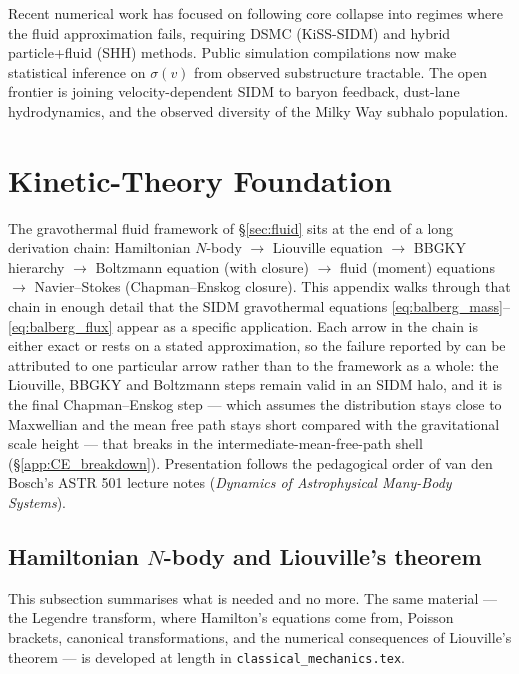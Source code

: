 \documentclass[12pt]{article}
\begin{document}
Recent numerical work \citep{Gurian2025Core,Schon2025} has focused on
following core collapse into regimes where the fluid approximation
fails, requiring DSMC (KiSS-SIDM) and hybrid particle+fluid (SHH)
methods.  Public simulation compilations \citep{Palubski2025} now
make statistical inference on $\sigma(v)$ from observed substructure
tractable.  The open frontier is joining velocity-dependent SIDM to
baryon feedback, dust-lane hydrodynamics, and the observed
diversity of the Milky Way subhalo population.

\appendix

\section{Kinetic-Theory Foundation}
\label{app:kinetic}

The gravothermal fluid framework of \S\ref{sec:fluid} sits at the end
of a long derivation chain: Hamiltonian $N$-body $\to$ Liouville
equation $\to$ BBGKY hierarchy $\to$ Boltzmann equation (with closure)
$\to$ fluid (moment) equations $\to$ Navier--Stokes (Chapman--Enskog
closure).  This appendix walks through that chain in enough detail
that the SIDM gravothermal equations
\eqref{eq:balberg_mass}--\eqref{eq:balberg_flux} appear as a specific
application.  Each arrow in the chain is either exact or rests on a
stated approximation, so the failure reported by
\citet{Gurian2025Core} can be attributed to one particular arrow rather
than to the framework as a whole: the Liouville, BBGKY and Boltzmann
steps remain valid in an SIDM halo, and it is the final
Chapman--Enskog step --- which assumes the distribution stays close to
Maxwellian and the mean free path stays short compared with the
gravitational scale height --- that breaks in the
intermediate-mean-free-path shell (\S\ref{app:CE_breakdown}).
Presentation follows the pedagogical order of van den Bosch's ASTR 501
lecture notes (\emph{Dynamics of Astrophysical Many-Body Systems}).

\subsection{Hamiltonian $N$-body and Liouville's theorem}
\label{app:liouville}

This subsection summarises what is needed and no more.  The same
material --- the Legendre transform, where Hamilton's equations come
from, Poisson brackets, canonical transformations, and the numerical
consequences of Liouville's theorem --- is developed at length in
\texttt{classical\_mechanics.tex}.
\end{document}
